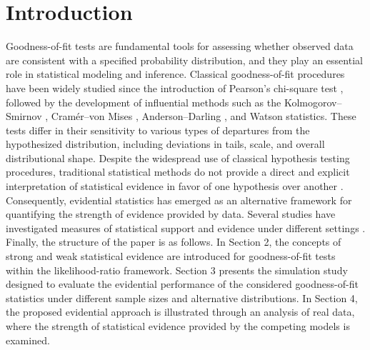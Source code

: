 \documentclass[twoside]{article}
\begin{document}
\section{Introduction}
Goodness-of-fit tests are fundamental tools for assessing whether observed data are consistent with a specified probability distribution, and they play an essential role in statistical modeling and inference. Classical goodness-of-fit procedures have been widely studied since the introduction of Pearson’s chi-square test \cite{Pearson:1900}, followed by the development of influential methods such as the Kolmogorov–Smirnov \cite{Kolmogorov:1933,Smirnov:1948}, Cramér–von Mises \cite{Cramer:1928,vonMises:1931}, Anderson–Darling \cite{Anderson:Darling:1952}, and Watson statistics. These tests differ in their sensitivity to various types of departures from the hypothesized distribution, including deviations in tails, scale, and overall distributional shape.
Despite the widespread use of classical hypothesis testing procedures, traditional statistical methods do not provide a direct and explicit interpretation of statistical evidence in favor of one hypothesis over another \cite{Royall:2000}. Consequently, evidential statistics has emerged as an alternative framework for quantifying the strength of evidence provided by data. Several studies have investigated measures of statistical support and evidence under different settings \cite{Emadi:Arghami:2003,Emadi:et:al:2007,Doostparast:Emadi:2006,Arashi:Emadi:2008,Habibirad:et:al:2006,Hashempour:2017,Sarvari:Doostparast:2025}.
Finally, the structure of the paper is as follows. In Section 2, the concepts of strong and weak statistical evidence are introduced for goodness-of-fit tests within the likelihood-ratio framework. Section 3 presents the simulation study designed to evaluate the evidential performance of the considered goodness-of-fit statistics under different sample sizes and alternative distributions. In Section 4, the proposed evidential approach is illustrated through an analysis of real data, where the strength of statistical evidence provided by the competing models is examined.
\end{document}
